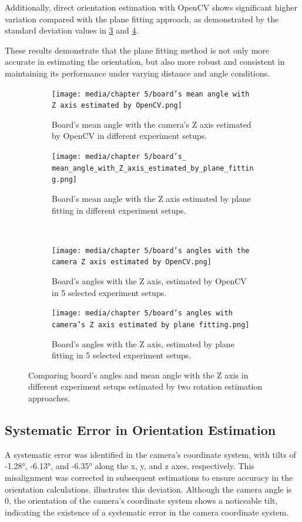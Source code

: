Additionally, direct orientation estimation with OpenCV shows significant higher variation compared with the plane fitting approach, as demonstrated by the standard deviation values in \cref{fig:opencv_angles} and \cref{fig:plane_fitting_angles}. 

These results demonstrate that the plane fitting method is not only more accurate in estimating the orientation, but also more robust and consistent in maintaining its performance under varying distance and angle conditions.
\begin{figure}[htpb]
    \centering
    \begin{subfigure}[t]{0.45\textwidth}
        \centering
        \texttt{[image: media/chapter 5/board’s mean angle with Z axis estimated by OpenCV.png]}
        \caption{Board's mean angle with the camera's Z axis estimated by OpenCV in different experiment setups.}
        \label{fig:opencv_mean_angle}
    \end{subfigure}\hfill
    \begin{subfigure}[t]{0.45\textwidth}
        \centering
        \texttt{[image: media/chapter 5/board’s\_ mean\_angle\_with\_Z\_axis\_estimated\_by\_plane\_fitting.png]}
        \caption{Board's mean angle with the Z axis estimated by plane fitting in different experiment setups.}
        \label{fig:plane_fitting_mean_angle}
    \end{subfigure}\\
    \begin{subfigure}[t]{0.45\textwidth}
        \centering
        \texttt{[image: media/chapter 5/board’s angles with the camera Z axis estimated by OpenCV.png]}
        \caption{Board's angles with the Z axis, estimated by OpenCV in 5 selected experiment setups.}
        \label{fig:opencv_angles}
    \end{subfigure}\hfill
    \begin{subfigure}[t]{0.45\textwidth}
        \centering
        \texttt{[image: media/chapter 5/board’s angles with camera's Z axis estimated by plane fitting.png]}
        \caption{Board's angles with the Z axis, estimated by plane fitting in 5 selected experiment setups.}
        \label{fig:plane_fitting_angles}
    \end{subfigure}
    \caption{Comparing board's angles and mean angle with the Z axis in different experiment setups estimated by two rotation estimation approaches.}
    \label{fig:distance_error_matrix}
\end{figure}


\subsection{Systematic Error in Orientation Estimation}
A systematic error was identified in the camera’s coordinate system, with tilts of -1.28°, -6.13°, and -6.35° along the x, y, and z axes, respectively. This misalignment was corrected in subsequent estimations to ensure accuracy in the orientation calculations.
 illustrates this deviation. Although the camera angle is 0, the orientation of the camera’s coordinate system shows a noticeable tilt, indicating the existence of a systematic error in the camera coordinate system.


